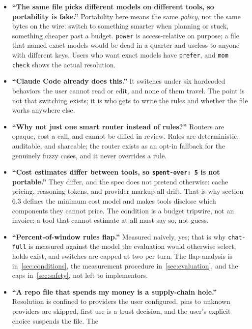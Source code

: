 \documentclass[11pt]{article}
\newcommand{\key}[1]{\texttt{#1}}
\begin{document}
\begin{itemize}
  \item \textbf{``The same file picks different models on different tools,
        so portability is fake.''} Portability here means the same
        \emph{policy}, not the same bytes on the wire: switch to something
        smarter when planning or stuck, something cheaper past a budget.
        \key{power} is access-relative on purpose; a file that named exact
        models would be dead in a quarter and useless to anyone with
        different keys. Users who want exact models have \key{prefer}, and
        \key{mom check} shows the actual resolution.
  \item \textbf{``Claude Code already does this.''} It switches under six
        hardcoded behaviors the user cannot read or edit, and none of them
        travel. The point is not that switching exists; it is who gets to
        write the rules and whether the file works anywhere else.
  \item \textbf{``Why not just one smart router instead of rules?''} Routers
        are opaque, cost a call, and cannot be diffed in review. Rules are
        deterministic, auditable, and shareable; the router exists as an
        opt-in fallback for the genuinely fuzzy cases, and it never
        overrides a rule.
  \item \textbf{``Cost estimates differ between tools, so
        \key{spent-over: 5} is not portable.''} They differ, and the spec
        does not pretend otherwise: cache pricing, reasoning tokens, and
        provider markup all drift. That is why section 6.3 defines the
        minimum cost model and makes tools disclose which components they
        cannot price. The condition is a budget tripwire, not an invoice; a
        tool that cannot estimate at all must say so, not guess.
  \item \textbf{``Percent-of-window rules flap.''} Measured naively, yes;
        that is why \key{chat-full} is measured against the model the
        evaluation would otherwise select, holds exist, and switches are
        capped at two per turn. The flap analysis is
        in~\ref{sec:conditions}, the measurement procedure
        in~\ref{sec:evaluation}, and the caps in~\ref{sec:safety}, not left
        to implementors.
  \item \textbf{``A repo file that spends my money is a supply-chain
        hole.''} Resolution is confined to providers the user configured,
        pins to unknown providers are skipped, first use is a trust
        decision, and the user's explicit choice suspends the file. The

\end{itemize}
\end{document}
